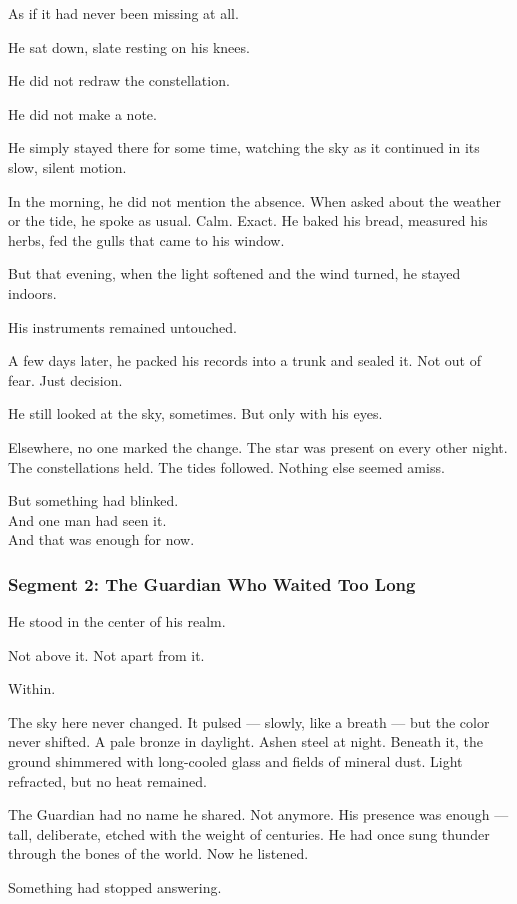 \documentclass[9pt]{article}
\begin{document}
As if it had never been missing at all.

He sat down, slate resting on his knees.

He did not redraw the constellation.

He did not make a note.

He simply stayed there for some time, watching the sky as it continued in its slow, silent motion.

In the morning, he did not mention the absence. When asked about the weather or the tide, he spoke as usual. Calm. Exact. He baked his bread, measured his herbs, fed the gulls that came to his window.

But that evening, when the light softened and the wind turned, he stayed indoors.

His instruments remained untouched.

A few days later, he packed his records into a trunk and sealed it. Not out of fear. Just decision.

He still looked at the sky, sometimes. But only with his eyes.

Elsewhere, no one marked the change. The star was present on every other night. The constellations held. The tides followed. Nothing else seemed amiss.

But something had blinked.\\
And one man had seen it.\\
And that was enough for now.


\newpage

\subsubsection*{Segment 2: The Guardian Who Waited Too Long}

He stood in the center of his realm.

Not above it. Not apart from it.

Within.

The sky here never changed. It pulsed — slowly, like a breath — but the color never shifted. A pale bronze in daylight. Ashen steel at night. Beneath it, the ground shimmered with long-cooled glass and fields of mineral dust. Light refracted, but no heat remained.

The Guardian had no name he shared. Not anymore. His presence was enough — tall, deliberate, etched with the weight of centuries. He had once sung thunder through the bones of the world. Now he listened.

Something had stopped answering.
\end{document}
